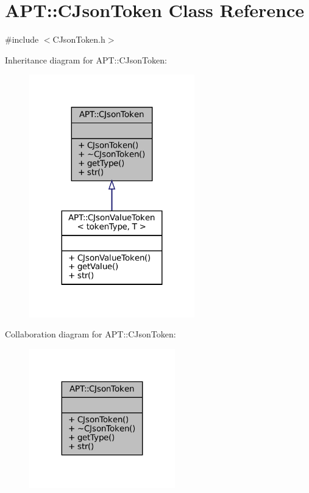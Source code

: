 \hypertarget{classAPT_1_1CJsonToken}{}\section{A\+PT\+:\+:C\+Json\+Token Class Reference}
\label{classAPT_1_1CJsonToken}


{\ttfamily \#include $<$C\+Json\+Token.\+h$>$}



Inheritance diagram for A\+PT\+:\+:C\+Json\+Token\+:
\nopagebreak
\begin{figure}[H]
\begin{center}
\leavevmode
\includegraphics[width=203pt]{classAPT_1_1CJsonToken__inherit__graph}
\end{center}
\end{figure}


Collaboration diagram for A\+PT\+:\+:C\+Json\+Token\+:
\nopagebreak
\begin{figure}[H]
\begin{center}
\leavevmode
\includegraphics[width=179pt]{classAPT_1_1CJsonToken__coll__graph}
\end{center}
\end{figure}
